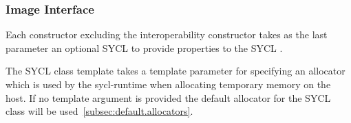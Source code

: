 \subsubsection{Image Interface}

Each constructor excluding the interoperability constructor takes as the last parameter an optional SYCL  to provide properties to the SYCL .

The SYCL  class template takes a template parameter  for specifying an allocator which is used by the \gls{sycl-runtime} when allocating temporary memory on the host. If no template argument is provided the default allocator for the SYCL  class  will be used~\ref{subsec:default.allocators}.



